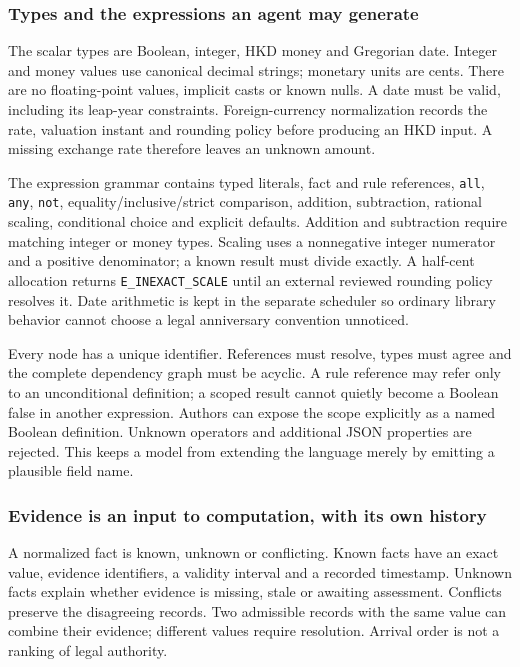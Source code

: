 \subsubsection{Types and the expressions an agent may generate}

The scalar types are Boolean, integer, HKD money and Gregorian date. Integer
and money values use canonical decimal strings; monetary units are cents.
There are no floating-point values, implicit casts or known nulls. A date must
be valid, including its leap-year constraints. Foreign-currency normalization
records the rate, valuation instant and rounding policy before producing an HKD
input. A missing exchange rate therefore leaves an unknown amount.

The expression grammar contains typed literals, fact and rule references,
\texttt{all}, \texttt{any}, \texttt{not}, equality/inclusive/strict comparison,
addition, subtraction, rational scaling, conditional choice and explicit defaults.
Addition and subtraction require matching integer or money types. Scaling uses
a nonnegative integer numerator and a positive denominator; a known result must
divide exactly. A half-cent allocation returns \texttt{E\_INEXACT\_SCALE} until
an external reviewed rounding policy resolves it. Date arithmetic is kept in
the separate scheduler so ordinary library behavior cannot choose a legal
anniversary convention unnoticed.

Every node has a unique identifier. References must resolve, types must agree
and the complete dependency graph must be acyclic. A rule reference may refer
only to an unconditional definition; a scoped result cannot quietly become a
Boolean false in another expression. Authors can expose the scope explicitly
as a named Boolean definition. Unknown operators and additional JSON properties
are rejected. This keeps a model from extending the language merely by emitting
a plausible field name.

\subsubsection{Evidence is an input to computation, with its own history}

A normalized fact is known, unknown or conflicting. Known facts have an exact
value, evidence identifiers, a validity interval and a recorded timestamp.
Unknown facts explain whether evidence is missing, stale or awaiting assessment.
Conflicts preserve the disagreeing records. Two admissible records with the
same value can combine their evidence; different values require resolution.
Arrival order is not a ranking of legal authority.

